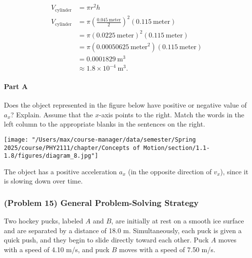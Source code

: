 \vspace{1em}

\begin{solution}
	\begin{align*}
		V_{\text{cylinder}} &= \pi r^2 h \\
		V_{\text{cylinder}} &= \pi \left( \frac{0.045~\text{meter}}{2} \right)^2 \left( 0.115~\text{meter} \right) \\
		&= \pi \left( 0.0225~\text{meter} \right)^2 \left( 0.115~\text{meter} \right) \\
		&= \pi \left( 0.00050625~\text{meter}^2 \right) \left( 0.115~\text{meter} \right) \\
		&= 0.0001829~\text{m}^3 \\
		&\approx 1.8 \times 10^{-4}~\text{m}^3
		.\end{align*}
\end{solution}

\newpage

\paragraph{Part A}

Does the object represented in the figure below have positive or negative value of $a_{x}$? Explain. Assume that the $x$-axis points to the right. Match the words in the left column to the appropriate blanks in the sentences on the right.

\begin{center}
	\texttt{[image: "/Users/max/course-manager/data/semester/Spring 2025/course/PHY2111/chapter/Concepts of Motion/section/1.1-1.8/figures/diagram\_8.jpg"]}
\end{center}

\begin{solution}
	The object has a positive acceleration $a_x$ (in the opposite direction of $v_x$), since it is slowing down over time.
\end{solution}

\newpage

\subsubsection{(Problem 15) General Problem-Solving Strategy}

Two hockey pucks, labeled $A$ and $B$, are initially at rest on a smooth ice surface and are separated by a distance of 18.0 m. Simultaneously, each puck is given a quick push, and they begin to slide directly toward each other. Puck $A$ moves with a speed of 4.10 m/s, and puck $B$ moves with a speed of 7.50 m/s.

